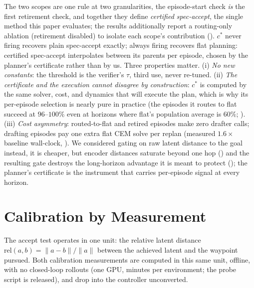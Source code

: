 \documentclass{article}
\begin{document}
The two scopes are one rule at two granularities, the episode-start check
\emph{is} the first retirement check, and together they define \emph{certified
spec-accept}, the single method this paper evaluates; the results additionally
report a routing-only ablation (retirement disabled) to isolate each scope's
contribution (). $c^{*}$ never firing recovers plain spec-accept
exactly; always firing recovers flat planning: certified spec-accept interpolates
between its parents per episode, chosen by the planner's certificate rather than by
us. Three properties matter. (i)
\emph{No new constants}: the threshold is the verifier's $\tau$, third use, never
re-tuned. (ii) \emph{The certificate and the execution cannot disagree by
construction}: $c^{*}$ is computed by the same solver, cost, and dynamics that will
execute the plan, which is why its per-episode selection is nearly pure in practice
(the episodes it routes to flat succeed at $96$--$100\%$ even at horizons where flat's
population average is $60\%$; ). (iii) \emph{Cost
asymmetry}: routed-to-flat and retired episodes make zero drafter calls; drafting
episodes pay one extra flat CEM solve per replan (measured $1.6\times$ baseline
wall-clock, ). We considered gating on raw latent distance to
the goal instead, it is cheaper, but encoder distances saturate beyond one hop
() and the resulting gate destroys the long-horizon advantage it
is meant to protect (); the planner's certificate is the
instrument that carries per-episode signal at every horizon.

\section{Calibration by Measurement}
\label{sec:calib}
The accept test operates in one unit: the relative latent distance
$\mathrm{rel}(a,b) = \|a-b\|/\|a\|$ between the achieved latent and the waypoint
pursued. Both calibration measurements are computed in this same unit, offline, with
no closed-loop rollouts (one GPU, minutes per environment; the probe script is
released), and drop into the controller unconverted.
\end{document}
